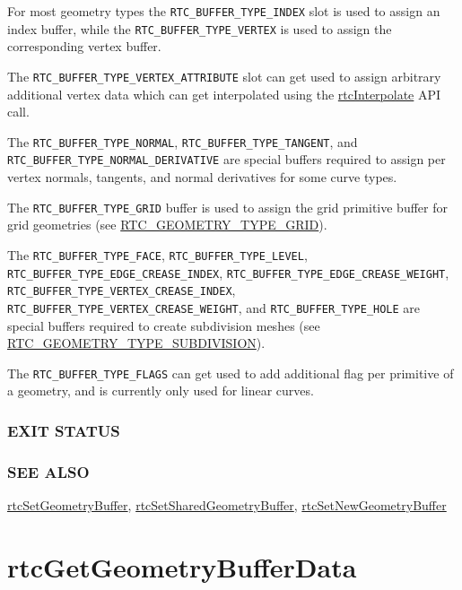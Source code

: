 For most geometry types the \texttt{RTC\_BUFFER\_TYPE\_INDEX} slot is
used to assign an index buffer, while the
\texttt{RTC\_BUFFER\_TYPE\_VERTEX} is used to assign the corresponding
vertex buffer.

The \texttt{RTC\_BUFFER\_TYPE\_VERTEX\_ATTRIBUTE} slot can get used to
assign arbitrary additional vertex data which can get interpolated using
the \hyperref[rtcinterpolate]{rtcInterpolate} API call.

The \texttt{RTC\_BUFFER\_TYPE\_NORMAL},
\texttt{RTC\_BUFFER\_TYPE\_TANGENT}, and
\texttt{RTC\_BUFFER\_TYPE\_NORMAL\_DERIVATIVE} are special buffers
required to assign per vertex normals, tangents, and normal derivatives
for some curve types.

The \texttt{RTC\_BUFFER\_TYPE\_GRID} buffer is used to assign the grid
primitive buffer for grid geometries (see
\hyperref[rtc_geometry_type_grid]{RTC\_GEOMETRY\_TYPE\_GRID}).

The \texttt{RTC\_BUFFER\_TYPE\_FACE}, \texttt{RTC\_BUFFER\_TYPE\_LEVEL},
\texttt{RTC\_BUFFER\_TYPE\_EDGE\_CREASE\_INDEX},
\texttt{RTC\_BUFFER\_TYPE\_EDGE\_CREASE\_WEIGHT},
\texttt{RTC\_BUFFER\_TYPE\_VERTEX\_CREASE\_INDEX},
\texttt{RTC\_BUFFER\_TYPE\_VERTEX\_CREASE\_WEIGHT}, and
\texttt{RTC\_BUFFER\_TYPE\_HOLE} are special buffers required to create
subdivision meshes (see
\hyperref[rtc_geometry_type_subdivision]{RTC\_GEOMETRY\_TYPE\_SUBDIVISION}).

The \texttt{RTC\_BUFFER\_TYPE\_FLAGS} can get used to add additional
flag per primitive of a geometry, and is currently only used for linear
curves.

\subsubsection{EXIT STATUS}\label{exit-status}

\subsubsection{SEE ALSO}\label{see-also}

\hyperref[rtcsetgeometrybuffer]{rtcSetGeometryBuffer},
\hyperref[rtcsetsharedgeometrybuffer]{rtcSetSharedGeometryBuffer},
\hyperref[rtcsetnewgeometrybuffer]{rtcSetNewGeometryBuffer}

\pagebreak

\section{rtcGetGeometryBufferData}\label{rtcgetgeometrybufferdata}

